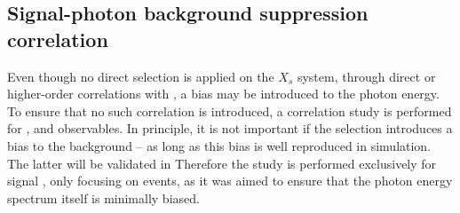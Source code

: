 \subsection{Signal-photon background suppression correlation}\label{sec:signal_photon_correlation}

Even though no direct selection is applied on the $X_s$ system, through direct or higher-order correlations with \EB, a bias may be introduced to the photon energy.
To ensure that no such correlation is introduced, a correlation study is performed for \piVeto, \etaVeto and \ZMVA observables.
In principle, it is not important if the selection introduces a bias to the background -- as long as this bias is well reproduced in simulation.
The latter will be validated in 
Therefore the study is performed exclusively for signal \MC, only focusing on \BtoXsgamma events, as it was aimed to ensure that the photon energy spectrum itself is minimally biased.

